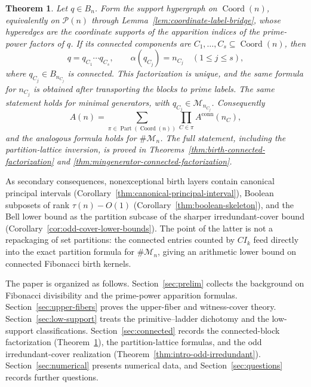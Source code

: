 \documentclass[11pt,letterpaper]{article}
\numberwithin{equation}{section}
\theoremstyle{plain}
\newtheorem{theorem}{Theorem}[section]
\theoremstyle{definition}
\theoremstyle{remark}
\DeclareMathOperator{\Part}{Part}
\DeclareMathOperator{\Coord}{Coord}
\begin{document}
\begin{theorem}\label{thm:intro-connected}
Let $q\in B_n$. Form the support hypergraph on $\Coord(n)$, equivalently on
$\mathcal P(n)$ through Lemma~\ref{lem:coordinate-label-bridge}, whose
hyperedges are the coordinate supports of the apparition indices of the
prime-power factors of $q$. If its connected components are
$C_1,\ldots,C_s\subseteq\Coord(n)$, then
\[
q=q_{C_1}\cdots q_{C_s},\qquad \alpha(q_{C_j})=n_{C_j}
\quad(1\le j\le s),
\]
where $q_{C_j}\in B_{n_{C_j}}$ is connected. This factorization is unique, and
the same formula for \(n_{C_j}\) is obtained after transporting the blocks to
prime labels.
The same statement holds for minimal generators, with
$q_{C_j}\in\mathcal M_{n_{C_j}}$. Consequently
\[
A(n)=\sum_{\pi\in\Part(\Coord(n))}
       \prod_{C\in\pi} A^{\mathrm{conn}}(n_C),
\]
and the analogous formula holds for $\#\mathcal M_n$. The full statement,
including the partition-lattice inversion, is proved in
Theorems~\ref{thm:birth-connected-factorization} and
\ref{thm:mingenerator-connected-factorization}.
\end{theorem}

As secondary consequences, nonexceptional birth layers contain canonical
principal intervals
(Corollary~\ref{thm:canonical-principal-interval}), Boolean subposets of rank
$\tau(n)-O(1)$ (Corollary~\ref{thm:boolean-skeleton}), and the Bell lower bound
as the partition subcase of the sharper irredundant-cover bound
(Corollary~\ref{cor:odd-cover-lower-bounds}). The point of the latter is not a
repackaging of set partitions: the connected entries counted by $CI_k$ feed
directly into the exact partition formula for $\#\mathcal M_n$, giving an
arithmetic lower bound on connected Fibonacci birth kernels.

The paper is organized as follows. Section~\ref{sec:prelim} collects the
background on Fibonacci divisibility and the prime-power apparition formulas.
Section~\ref{sec:upper-fibers} proves the upper-fiber and witness-cover
theory. Section~\ref{sec:low-support} treats the
primitive--ladder dichotomy and the low-support classifications.
Section~\ref{sec:connected} records the connected-block factorization
(Theorem~\ref{thm:intro-connected}), the partition-lattice formulas, and the
odd irredundant-cover realization (Theorem~\ref{thm:intro-odd-irredundant}).
Section~\ref{sec:numerical} presents numerical data, and
Section~\ref{sec:questions} records further questions.

\end{document}
